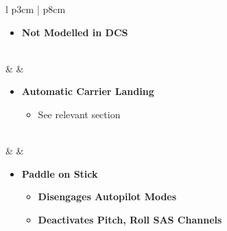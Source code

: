\documentclass[8pt,usenames,dvipsnames,twoside]{article}
\begin{document}
\begin{center}
\begin{longtable}{l p{3cm} | p{8cm}}
\begin{minipage}[t]{\linewidth}
\begin{itemize}
\begin{itemize}
							\item \textbf{Not Modelled in DCS}
						\end{itemize}
					\end{itemize}
				\end{minipage} \\
				\midrule
				\textbullet &  & 
				\begin{minipage}[t]{\linewidth}
					\vspace{-7pt}
					\begin{itemize}
						\item \textbf{Automatic Carrier Landing} 
						\begin{itemize}
							\item See relevant section
						\end{itemize}
					\end{itemize}
				\end{minipage} \\
				\midrule
				\textbullet &  & 
				\begin{minipage}[t]{\linewidth}
					\vspace{-7pt}
					\begin{itemize}
						\item \textbf{Paddle on Stick}
						\begin{itemize}
							\item \textbf{Disengages Autopilot Modes}
							\item \textbf{Deactivates Pitch, Roll SAS Channels}
						\end{itemize}
					\end{itemize}
				\end{minipage} \\
				\bottomrule
			\end{longtable}
		\end{center}
	
\end{document}
